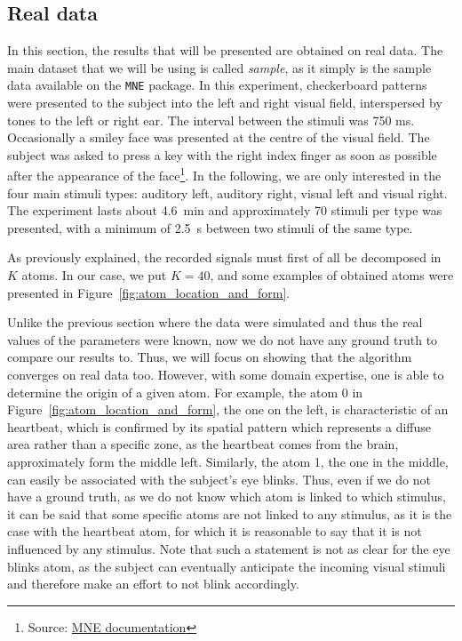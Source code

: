\subsection{Real data}\label{res_real_data}

In this section, the results that will be presented are obtained on real data.
The main dataset that we will be using is called \textit{sample}, as it simply is the sample data available on the \texttt{MNE} package.
In this experiment, checkerboard patterns were presented to the subject into the left and right visual field, interspersed by tones to the left or right ear.
The interval between the stimuli was 750 ms.
Occasionally a smiley face was presented at the centre of the visual field.
The subject was asked to press a key with the right index finger as soon as possible after the appearance of the face\footnote{Source: \href{https://mne.tools/0.11/manual/datasets_index.html}{MNE documentation}}.
In the following, we are only interested in the four main stimuli types: auditory left, auditory right, visual left and visual right.
The experiment lasts about \SI{4.6}{\minute} and approximately 70 stimuli per type was presented, with a minimum of \SI{2.5}{\second} between two stimuli  of the same type.

As previously explained, the recorded signals must first of all be decomposed in $K$ atoms.
In our case, we put $K=40$, and some examples of obtained atoms were presented in Figure~\ref{fig:atom_location_and_form}.

Unlike the previous section where the data were simulated and thus the real values of the parameters were known, now we do not have any ground truth to compare our results to.
Thus, we will focus on showing that the algorithm converges on real data too.
However, with some domain expertise, one is able to determine the origin of a given atom.
For example, the atom 0 in Figure~\ref{fig:atom_location_and_form}, the one on the left, is characteristic of an heartbeat, which is confirmed by its spatial pattern which represents a diffuse area rather than a specific zone, as the heartbeat comes from  the brain, approximately form the middle left.
Similarly, the atom 1, the one in the middle, can easily be associated with the subject's eye blinks.
Thus, even if we do not have a ground truth, as we do not know which atom is linked to which stimulus, it can be said that some specific atoms are not linked to any stimulus, as it is the case with the heartbeat atom, for which it is reasonable to say that it is not influenced by any stimulus.
Note that such a statement is not as clear for the eye blinks atom, as the subject can eventually anticipate the incoming visual stimuli and therefore make an effort to not blink accordingly.

